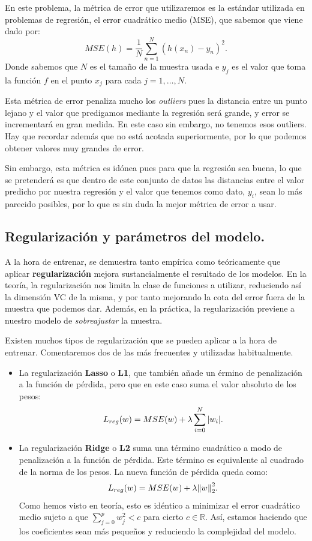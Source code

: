 \documentclass[a4paper, 20pt]{article}
\newcommand{\R}{\mathbb R}
\begin{document}
En este problema, la métrica de error que utilizaremos es la estándar utilizada en problemas de regresión, el error cuadrático medio (MSE), que sabemos que viene dado por:
\[
MSE(h) = \frac{1}{N} \sum_{n = 1}^N (h(x_n) - y_n)^2.
\]
Donde sabemos que $N$ es el tamaño de la muestra usada e $y_j$ es el valor que toma la función $f$ en el punto $x_j$ para cada $j = 1,\dots ,N$. 

Esta métrica de error penaliza mucho los \emph{outliers} pues la distancia entre un punto lejano y el valor que predigamos mediante la regresión será grande, y error se incrementará en gran medida. En este caso sin embargo, no tenemos esos outliers. Hay que recordar además que no está acotada superiormente, por lo que podemos obtener valores muy grandes de error.

Sin embargo, esta métrica es idónea pues para que la regresión sea buena, lo que se pretenderá es que dentro de este conjunto de datos las distancias entre el valor predicho por nuestra regresión y el valor que tenemos como dato, $y_i$, sean lo más parecido posibles, por lo que es sin duda la mejor métrica de error a usar.


\subsection{Regularización y parámetros del modelo.}

A la hora de entrenar, se demuestra tanto empírica como teóricamente que aplicar \textbf{regularización} mejora sustancialmente el resultado de los modelos. En la teoría, la regularización nos limita la clase de funciones a utilizar, reduciendo así la dimensión VC de la misma, y por tanto mejorando la cota del error fuera de la muestra que podemos dar. Además, en la práctica, la regularización previene a nuestro modelo de \emph{sobreajustar} la muestra.

Existen muchos tipos de regularización que se pueden aplicar a la hora de entrenar. Comentaremos dos de las más frecuentes y utilizadas habitualmente. 

\begin{itemize}
   

    \item La regularización \textbf{Lasso} o \textbf{L1}, que también añade un érmino de penalización a la función de pérdida, pero que en este caso suma el valor absoluto de los pesos:
    $$
    L_{reg}(w) = MSE(w) + \lambda \sum_{i = 0}^N \abs{w_i}.
    $$

    \item La regularización \textbf{Ridge} o \textbf{L2} suma una término cuadrático a modo de penalización a la función de pérdida. Este término es equivalente al cuadrado de la norma de los pesos.  La nueva función de pérdida queda como:
    $$
    L_{reg}(w) = MSE(w) + \lambda \norm{w}_2^2 .
    $$
    Como hemos visto en teoría, esto es idéntico a minimizar el error cuadrático medio sujeto a que $\sum_{j = 0}^p w_j^2 < c$ para cierto $c\in \R$. Así, estamos haciendo que los coeficientes sean más pequeños y reduciendo la complejidad del modelo.
\end{itemize}
\end{document}
